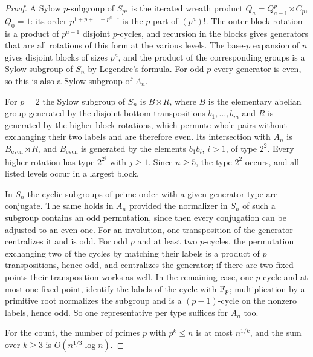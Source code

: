 \begin{proof}
A Sylow $p$-subgroup of $S_{p^a}$ is the iterated wreath product
$Q_a=Q_{a-1}^p\rtimes C_p$, $Q_0=1$: its order $p^{1+p+\dots+p^{a-1}}$ is the $p$-part of
$(p^a)!$. The outer block rotation is a product of $p^{a-1}$ disjoint $p$-cycles, and
recursion in the blocks gives generators that are all rotations of this form at the
various levels. The base-$p$ expansion of $n$ gives disjoint blocks of sizes $p^a$, and the
product of the corresponding groups is a Sylow subgroup of $S_n$ by Legendre's formula.
For odd $p$ every generator is even, so this is also a Sylow subgroup of $A_n$.

For $p=2$ the Sylow subgroup of $S_n$ is $B\rtimes R$, where $B$ is the elementary abelian
group generated by the disjoint bottom transpositions $b_1,\dots,b_m$ and $R$ is generated
by the higher block rotations, which permute whole pairs without exchanging their two
labels and are therefore even. Its intersection with $A_n$ is $B_{\mathrm{even}}\rtimes R$,
and $B_{\mathrm{even}}$ is generated by the elements $b_1b_i$, $i>1$, of type $2^2$. Every
higher rotation has type $2^{2^j}$ with $j\ge1$. Since $n\ge5$, the type $2^2$ occurs, and
all listed levels occur in a largest block.

In $S_n$ the cyclic subgroups of prime order with a given generator type are conjugate.
The same holds in $A_n$ provided the normalizer in $S_n$ of such a subgroup contains an odd
permutation, since then every conjugation can be adjusted to an even one. For an
involution, one transposition of the generator centralizes it and is odd. For odd $p$ and
at least two $p$-cycles, the permutation exchanging two of the cycles by matching their
labels is a product of $p$ transpositions, hence odd, and centralizes the generator; if
there are two fixed points their transposition works as well. In the remaining case, one
$p$-cycle and at most one fixed point, identify the labels of the cycle with $\mathbb{F}_p$;
multiplication by a primitive root normalizes the subgroup and is a $(p-1)$-cycle on the
nonzero labels, hence odd. So one representative per type suffices for $A_n$ too.

For the count, the number of primes $p$ with $p^k\le n$ is at most $n^{1/k}$, and the sum
over $k\ge3$ is $O(n^{1/3}\log n)$.
\end{proof}


